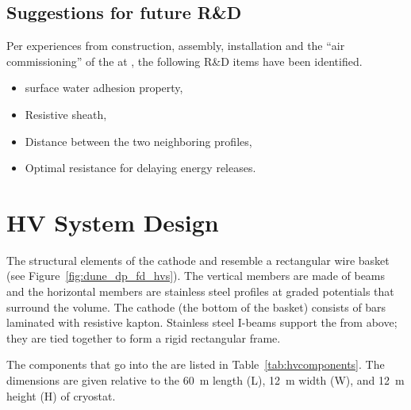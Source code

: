 \subsection{Suggestions for future R\&D}
\label{sec:fddp-hv-protodune-rd}
Per experiences from construction, assembly, installation and the ``air commissioning'' of the  at , the following R\&D items have been identified.

\begin{itemize}
    \item {} surface water adhesion property,
    \item Resistive sheath, 
    \item Distance between the two neighboring profiles,
    \item Optimal resistance for delaying energy releases. 
\end{itemize}



\section{HV System Design}
\label{sec:fddp-hv-design}

The structural elements of the  cathode and  resemble a rectangular wire basket (see Figure~\ref{fig:dune_dp_fd_hvs}). The vertical  members are made of  beams and the horizontal members are stainless steel profiles at graded potentials that surround the  volume. The cathode (the bottom of the basket) consists of  bars laminated with resistive kapton.  Stainless steel I-beams support the  from above; they are tied together to form a rigid rectangular frame.  


The components that go into the  are listed in Table~\ref{tab:hvcomponents}. The dimensions are given relative to the \SI{60}{m} length (L), \SI{12}{m} width (W), and \SI{12}{m} height (H) of cryostat. 

